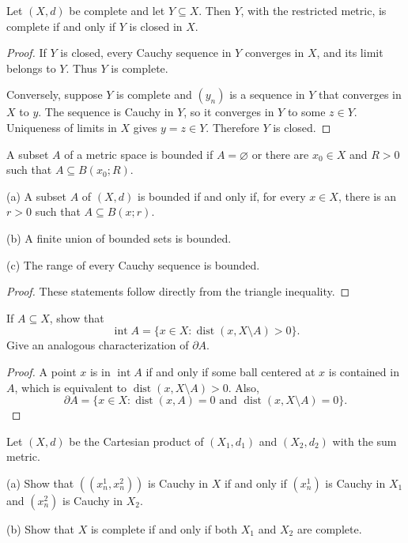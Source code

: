 \begin{thm}
Let $(X,d)$ be complete and let $Y\subseteq X$. Then $Y$, with the restricted
metric, is complete if and only if $Y$ is closed in $X$.
\end{thm}

\begin{proof}
If $Y$ is closed, every Cauchy sequence in $Y$ converges in $X$, and its limit
belongs to $Y$. Thus $Y$ is complete.

Conversely, suppose $Y$ is complete and $(y_n)$ is a sequence in $Y$ that
converges in $X$ to $y$. The sequence is Cauchy in $Y$, so it converges in
$Y$ to some $z\in Y$. Uniqueness of limits in $X$ gives $y=z\in Y$.
Therefore $Y$ is closed.
\end{proof}

\begin{de}
A subset $A$ of a metric space is bounded if $A=\varnothing$ or there are
$x_0\in X$ and $R>0$ such that $A\subseteq B(x_0;R)$.
\end{de}

\begin{thm}
(a) A subset $A$ of $(X,d)$ is bounded if and only if, for every $x\in X$,
there is an $r>0$ such that $A\subseteq B(x;r)$.

(b) A finite union of bounded sets is bounded.

(c) The range of every Cauchy sequence is bounded.
\end{thm}

\begin{proof}
These statements follow directly from the triangle inequality.
\end{proof}

\begin{ex}
If $A\subseteq X$, show that
\[
\operatorname{int}A
=\{x\in X:\operatorname{dist}(x,X\setminus A)>0\}.
\]
Give an analogous characterization of $\partial A$.
\end{ex}

\begin{proof}
A point $x$ is in $\operatorname{int}A$ if and only if some ball centered at
$x$ is contained in $A$, which is equivalent to
$\operatorname{dist}(x,X\setminus A)>0$. Also,
\[
\partial A
=\{x\in X:\operatorname{dist}(x,A)=0
\text{ and }\operatorname{dist}(x,X\setminus A)=0\}.
\]
\end{proof}

\begin{ex}
Let $(X,d)$ be the Cartesian product of $(X_1,d_1)$ and $(X_2,d_2)$ with the
sum metric.

(a) Show that $((x_n^1,x_n^2))$ is Cauchy in $X$ if and only if $(x_n^1)$ is
Cauchy in $X_1$ and $(x_n^2)$ is Cauchy in $X_2$.

(b) Show that $X$ is complete if and only if both $X_1$ and $X_2$ are
complete.
\end{ex}

